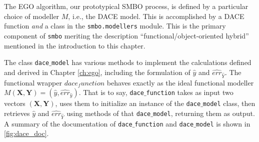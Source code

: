 The EGO algorithm, our prototypical SMBO process, is defined by a particular choice of modeller $M$, i.e., the DACE model. This is accomplished by a DACE function \emph{and} a class in the \texttt{smbo.modellers} module. This is the primary component of \texttt{smbo} meriting the description ``functional/object-oriented hybrid'' mentioned in the introduction to this chapter. 

The class \texttt{dace$\_$model} has various methods to implement the calculations defined and derived in Chapter \ref{ch:ego}, including the formulation of $\hat{y}$ and $\hat{err}_{\hat{Y}}$. The functional wrapper $dace_function$ behaves exactly as the ideal functional modeller $M(\mathbf{X},\mathbf{Y}) = (\hat{y},\hat{err}_{\hat{y}})$. That is to say, \texttt{dace$\_$function} takes as input two vectors $(\mathbf{X},\mathbf{Y})$, uses them to initialize an instance of the \texttt{dace$\_$model} class, then retrieves $\hat{y}$ and $\hat{err}_{\hat{Y}}$ using methods of that \texttt{dace$\_$model}, returning them as output. A summary of the documentation of \texttt{dace$\_$function} and \texttt{dace$\_$model} is shown in \ref{fig:dace_doc}.


\begin{minipage}{\textwidth}
\begin{framed}

\end{framed}

 \label{fig:dace_doc}

\end{minipage}



